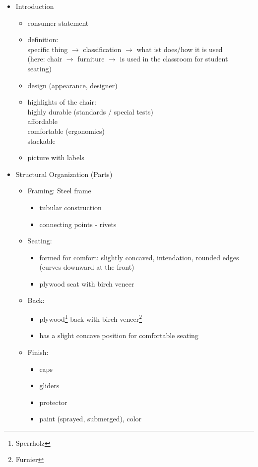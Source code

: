 \begin{itemize}
\item Introduction
\begin{itemize}
\item consumer statement
\item definition:\\
specific thing $\to$ classification $\to$ what ist does/how it is used\\
(here: chair $\to$ furniture $\to$ is used in the classroom for student seating)
\item design (appearance, designer)
\item highlights of the chair:\\
highly durable (standards / special tests)\\
affordable\\
comfortable (ergonomics)\\
stackable
\item picture with labels
\end{itemize}
\item Structural Organization (Parts)
\begin{itemize}
\item Framing: Steel frame
\begin{itemize}
\item tubular construction
\item connecting points - rivets
\end{itemize}
\item Seating:
\begin{itemize}
\item formed for comfort: slightly concaved, intendation, rounded edges (curves downward at the front)
\item plywood seat with birch veneer
\end{itemize} 
\item Back:
\begin{itemize}
\item plywood\footnote{Sperrholz} back with birch veneer\footnote{Furnier}
\item has a slight concave position for comfortable seating
\end{itemize}
\item Finish: 
\begin{itemize}
\item caps
\item gliders
\item protector
\item paint (sprayed, submerged), color

\end{itemize}
\end{itemize}
\end{itemize}
